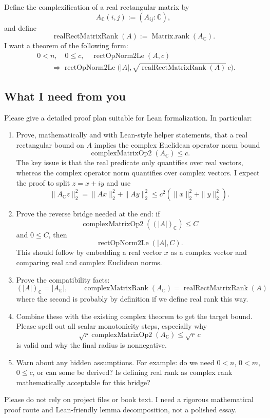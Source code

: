 \documentclass{article}
\begin{document}
Define the complexification of a real rectangular matrix by
\[
  A_\mathbb{C}(i,j) := (A_{ij} : \mathbb{C}),
\]
and define
\[
  \operatorname{realRectMatrixRank}(A)
  := \operatorname{Matrix.rank}(A_\mathbb{C}).
\]
I want a theorem of the following form:
\[
\begin{aligned}
&0<n,\quad 0\le c,\quad \operatorname{rectOpNorm2Le}(A,c)\\
&\qquad\Longrightarrow
\operatorname{rectOpNorm2Le}\bigl(|A|,\sqrt{\operatorname{realRectMatrixRank}(A)}\,c\bigr).
\end{aligned}
\]

\subsection*{What I need from you}

Please give a detailed proof plan suitable for Lean formalization.  In particular:

\begin{enumerate}
\item Prove, mathematically and with Lean-style helper statements, that a real rectangular bound on \(A\) implies the complex Euclidean operator norm bound
\[
  \operatorname{complexMatrixOp2}(A_\mathbb{C}) \le c.
\]
The key issue is that the real predicate only quantifies over real vectors, whereas the complex operator norm quantifies over complex vectors.  I expect the proof to split \(z=x+iy\) and use
\[
  \|A_\mathbb{C}z\|_2^2 = \|Ax\|_2^2+\|Ay\|_2^2
  \le c^2(\|x\|_2^2+\|y\|_2^2).
\]

\item Prove the reverse bridge needed at the end: if
\[
  \operatorname{complexMatrixOp2}((|A|)_\mathbb{C}) \le C
\]
and \(0\le C\), then
\[
  \operatorname{rectOpNorm2Le}(|A|,C).
\]
This should follow by embedding a real vector \(x\) as a complex vector and comparing real and complex Euclidean norms.

\item Prove the compatibility facts:
\[
  (|A|)_\mathbb{C} = |A_\mathbb{C}|,
  \qquad
  \operatorname{complexMatrixRank}(A_\mathbb{C})
  = \operatorname{realRectMatrixRank}(A)
\]
where the second is probably by definition if we define real rank this way.

\item Combine these with the existing complex theorem to get the target bound.  Please spell out all scalar monotonicity steps, especially why
\[
  \sqrt{r}\operatorname{complexMatrixOp2}(A_\mathbb{C})
  \le
  \sqrt{r}\,c
\]
is valid and why the final radius is nonnegative.

\item Warn about any hidden assumptions.  For example: do we need \(0<n\), \(0<m\), \(0\le c\), or can some be derived?  Is defining real rank as complex rank mathematically acceptable for this bridge?
\end{enumerate}

Please do not rely on project files or book text.  I need a rigorous mathematical proof route and Lean-friendly lemma decomposition, not a polished essay.
\end{document}
